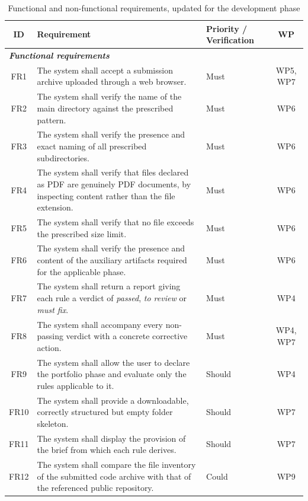 \documentclass[a4paper,11pt]{article}
\begin{document}
\begin{table}[H]
\centering
\caption{Functional and non-functional requirements, updated for the development phase}
\label{tab:requirements}
\footnotesize
\renewcommand{\arraystretch}{1.2}
\setlength{\tabcolsep}{4pt}
\begin{tabularx}{\textwidth}{|c|X|p{2.5cm}|c|}
\hline
\rowcolor{gray!15}
\textbf{ID} & \textbf{Requirement} & \textbf{Priority / Verification} & \textbf{WP} \\
\hline
\hline
\multicolumn{4}{|l|}{\cellcolor{blue!8}\textit{\textbf{Functional requirements}}} \\
\hline
FR1 & The system shall accept a submission archive uploaded through a web browser. & Must & WP5, WP7 \\
\hline
FR2 & The system shall verify the name of the main directory against the prescribed pattern. & Must & WP6 \\
\hline
FR3 & The system shall verify the presence and exact naming of all prescribed subdirectories. & Must & WP6 \\
\hline
FR4 & The system shall verify that files declared as PDF are genuinely PDF documents, by inspecting content rather than the file extension. & Must & WP6 \\
\hline
FR5 & The system shall verify that no file exceeds the prescribed size limit. & Must & WP6 \\
\hline
FR6 & The system shall verify the presence and content of the auxiliary artifacts required for the applicable phase. & Must & WP6 \\
\hline
FR7 & The system shall return a report giving each rule a verdict of \textit{passed}, \textit{to review} or \textit{must fix}. & Must & WP4 \\
\hline
FR8 & The system shall accompany every non-passing verdict with a concrete corrective action. & Must & WP4, WP7 \\
\hline
FR9 & The system shall allow the user to declare the portfolio phase and evaluate only the rules applicable to it. & Should & WP4 \\
\hline
FR10 & The system shall provide a downloadable, correctly structured but empty folder skeleton. & Should & WP7 \\
\hline
FR11 & The system shall display the provision of the brief from which each rule derives. & Should & WP7 \\
\hline
FR12 & The system shall compare the file inventory of the submitted code archive with that of the referenced public repository. & Could & WP9 \\

\end{tabularx}
\end{table}
\end{document}
